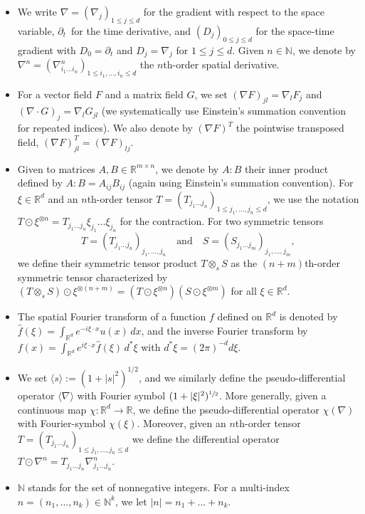 \documentclass[JEP,XML,SOM,Unicode,published]{cedram}
\theoremstyle{plain}
\theoremstyle{definition}
\numberwithin{equation}{section}
\newcommand{\N}{\mathbb N}
\newcommand{\R}{\mathbb R}
\begin{document}
\begin{itemize}
\item We write $\nabla=(\nabla_j)_{1\le j\le d}$ for the gradient with respect to the space variable, $\partial_t$~for the time derivative, and $(D_j)_{0\le j\le d}$ for the space-time gradient with $D_0=\partial_t$ and $D_j=\nabla_j$ for $1\le j\le d$. {Given $n\in\N$, we denote by $\nabla^n=(\nabla^n_{i_1\ldots i_n})_{1\leq i_1,\ldots,i_n\leq d}$ the $n$th-order spatial derivative.}
\item For a vector field $F$ and a matrix field $G$, we set $(\nabla F)_{jl}=\nabla_lF_j$ and $(\nabla\cdot G)_j=\nabla_l G_{jl}$ (we systematically use Einstein's summation convention for repeated indices). {We also denote by $(\nabla F)^T$ the pointwise transpose{d} field, $(\nabla F)^T_{jl}=(\nabla F)_{lj}$.}
\item {Given to matrices $A,B\in\R^{m\times n}$, we denote by $A:B$ their inner product defined by $A:B=A_{ij}B_{ij}$ (again using Einstein's summation convention).}
For $\xi\in\R^d$ and an $n$th-order tensor $T=(T_{j_1\ldots j_n})_{1\le j_1,\ldots,j_n\le d}$, we use the notation \mbox{$T\odot \xi^{\otimes n}=T_{j_1\ldots j_n}\xi_{j_1}\ldots\xi_{j_n}$} for the contraction. For two symmetric tensors
\[
T=(T_{j_1\ldots j_n})_{ j_1,\ldots,j_n}\quad\text{and}\quad S=(S_{j_1\ldots j_m})_{j_1,\ldots,j_m},
\]
we define their symmetric \hbox{tensor} product $T\otimes_sS$ as the $(n+m)$th-order symmetric tensor characterized by $(T\otimes_sS)\odot \xi^{\otimes(n+m)}=(T\odot\xi^{\otimes n})(S\odot\xi^{\otimes m})$ for all $\xi\in\R^d$.
\item The spatial Fourier transform of a function $f$ defined on $\R^d$ is denoted by $\hat f(\xi)=\int_{\R^d}e^{-i\xi\cdot x}u(x)\,dx$, and the inverse Fourier transform by $f(x)=\int_{\R^d}e^{i\xi\cdot x}\hat f(\xi)\,d^*\xi$ with $d^*\xi=(2\pi)^{-d}d\xi$.
\item We set $\langle s \rangle:= (1+|s|^2)^{1/2}$, and we similarly {define the pseudo-differential operator $\langle\nabla\rangle$ with Fourier symbol $(1+|\xi|^2)^{\sfrac12}$}. {More generally, given a continuous map \hbox{$\chi:\R^d\to\R$}, we define the pseudo-differential operator $\chi(\nabla)$ with Fourier-symbol $\chi(\xi)$. Moreover, given an $n$th-order tensor $T=(T_{j_1\ldots j_n})_{1\leq j_1,\ldots,j_n\leq d}$ we define the differential operator $T\odot\nabla^n=T_{j_1\ldots j_n}\nabla^n_{j_1\ldots j_n}$.}
\item $\N$ stands for the set of nonnegative integers. For a multi-index $n=(n_1,\ldots,n_k)\in\N^k$, we let $|n|=n_1+\ldots+n_k$.

\end{itemize}
\end{document}
